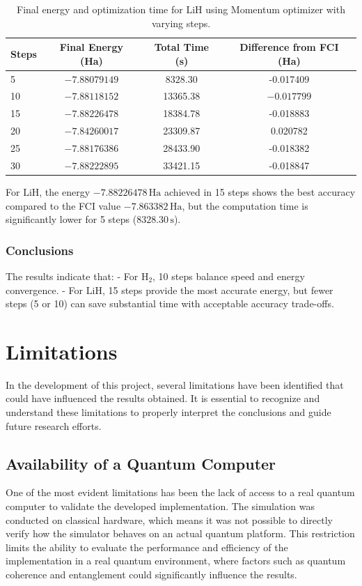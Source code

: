 \begin{table}[H]
\centering
\caption{Final energy and optimization time for \(\mathrm{LiH}\) using Momentum optimizer with varying steps.}
\begin{tabular}{lccc}
\toprule
\textbf{Steps} & \textbf{Final Energy (Ha)} & \textbf{Total Time (s)} & \textbf{Difference from FCI (Ha)} \\
\midrule
5 & \(-7.88079149\) & \(\mathbf{8328.30}\) & -0.017409 \\
10 & \(-7.88118152\) & 13365.38 & \(\mathbf{-0.017799}\) \\
15 & \(-7.88226478\) & 18384.78 & -0.018883 \\
20 & \(-7.84260017\) & 23309.87 & 0.020782 \\
25 & \(-7.88176386\) & 28433.90 & -0.018382 \\
30 & \(-7.88222895\) & 33421.15 & -0.018847 \\
\bottomrule
\end{tabular}
\end{table}

For \(\mathrm{LiH}\), the energy \(-7.88226478\,\mathrm{Ha}\) achieved in 15 steps shows the best accuracy compared to the FCI value \(-7.863382\,\mathrm{Ha}\), but the computation time is significantly lower for 5 steps (\(8328.30\,\mathrm{s}\)).

\subsubsection{Conclusions}

The results indicate that:
- For \(\mathrm{H_2}\), 10 steps balance speed and energy convergence.
- For \(\mathrm{LiH}\), 15 steps provide the most accurate energy, but fewer steps (5 or 10) can save substantial time with acceptable accuracy trade-offs.



\section{Limitations}
In the development of this project, several limitations have been identified that could have influenced the results obtained. It is essential to recognize and understand these limitations to properly interpret the conclusions and guide future research efforts.

\subsection{Availability of a Quantum Computer}
One of the most evident limitations has been the lack of access to a real quantum computer to validate the developed implementation. The simulation was conducted on classical hardware, which means it was not possible to directly verify how the simulator behaves on an actual quantum platform. This restriction limits the ability to evaluate the performance and efficiency of the implementation in a real quantum environment, where factors such as quantum coherence and entanglement could significantly influence the results.

